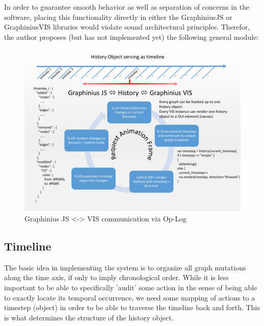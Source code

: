 	In order to guarantee smooth behavior as well as separation of concerns in the software, placing this functionality directly in either the GraphiniusJS or GraphiniusVIS libraries would violate sound architectural principles. Therefor, the author proposes (but has not implemented yet) the following general module:
	
		\begin{figure}[H]
			\label{fig_history_workflow}
			\centering
			\vspace{-.3cm}
			\hspace*{-1.0cm}
			\includegraphics[angle=90,width=1.1\textwidth]{figures/History_Workflow_pdf}
			\caption{Graphinius JS <-> VIS communication via Op-Log}
		\end{figure}

	\subsection{Timeline}
	\label{ssect:timeline}
	
	The basic idea in implementing the system is to organize all graph mutations along the time axis, if only to imply chronological order. While it is less important to be able to specifically 'audit' some action in the sense of being able to exactly locate its temporal occurrence, we need some mapping of actions to a timestep (object) in order to be able to traverse the timeline back and forth. This is what determines the structure of the history object.
	
